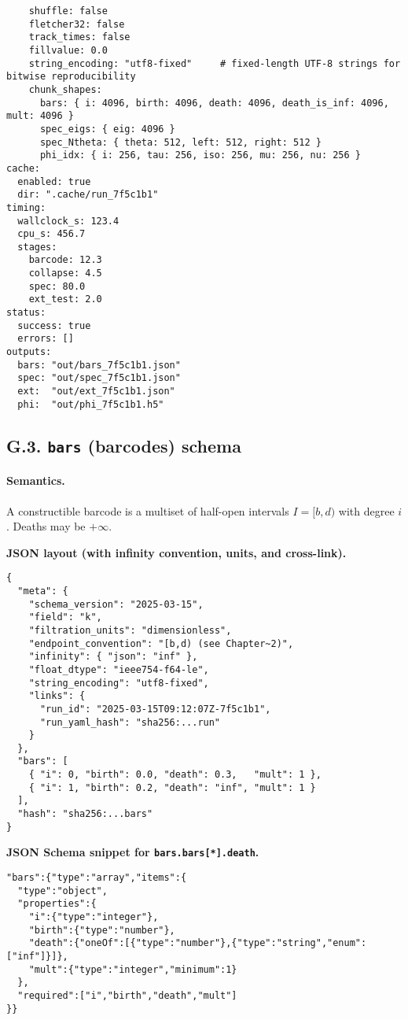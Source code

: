 \documentclass[11pt]{article}
\numberwithin{equation}{section}
\theoremstyle{plain}
\theoremstyle{definition}
\theoremstyle{remark}
\theoremstyle{plain}
\theoremstyle{definition}
\numberwithin{equation}{section}
\theoremstyle{definition}
\numberwithin{equation}{section}
\theoremstyle{plain}
\theoremstyle{definition}
\theoremstyle{remark}
\begin{document}
\begin{verbatim}
    shuffle: false
    fletcher32: false
    track_times: false
    fillvalue: 0.0
    string_encoding: "utf8-fixed"     # fixed-length UTF-8 strings for bitwise reproducibility
    chunk_shapes:
      bars: { i: 4096, birth: 4096, death: 4096, death_is_inf: 4096, mult: 4096 }
      spec_eigs: { eig: 4096 }
      spec_Ntheta: { theta: 512, left: 512, right: 512 }
      phi_idx: { i: 256, tau: 256, iso: 256, mu: 256, nu: 256 }
cache:
  enabled: true
  dir: ".cache/run_7f5c1b1"
timing:
  wallclock_s: 123.4
  cpu_s: 456.7
  stages:
    barcode: 12.3
    collapse: 4.5
    spec: 80.0
    ext_test: 2.0
status:
  success: true
  errors: []
outputs:
  bars: "out/bars_7f5c1b1.json"
  spec: "out/spec_7f5c1b1.json"
  ext:  "out/ext_7f5c1b1.json"
  phi:  "out/phi_7f5c1b1.h5"
\end{verbatim}

\subsection*{G.3. \texttt{bars} (barcodes) schema}
\paragraph{Semantics.} A constructible barcode is a multiset of half-open intervals \(I=[b,d)\) with degree \(i\).
Deaths may be \(+\infty\).

\noindent\textbf{JSON layout (with infinity convention, units, and cross-link).}
\begin{verbatim}
{
  "meta": {
    "schema_version": "2025-03-15",
    "field": "k",
    "filtration_units": "dimensionless",
    "endpoint_convention": "[b,d) (see Chapter~2)",
    "infinity": { "json": "inf" },
    "float_dtype": "ieee754-f64-le",
    "string_encoding": "utf8-fixed",
    "links": {
      "run_id": "2025-03-15T09:12:07Z-7f5c1b1",
      "run_yaml_hash": "sha256:...run"
    }
  },
  "bars": [
    { "i": 0, "birth": 0.0, "death": 0.3,   "mult": 1 },
    { "i": 1, "birth": 0.2, "death": "inf", "mult": 1 }
  ],
  "hash": "sha256:...bars"
}
\end{verbatim}

\noindent\textbf{JSON Schema snippet for \texttt{bars.bars[*].death}.}
\begin{verbatim}
"bars":{"type":"array","items":{
  "type":"object",
  "properties":{
    "i":{"type":"integer"},
    "birth":{"type":"number"},
    "death":{"oneOf":[{"type":"number"},{"type":"string","enum":["inf"]}]},
    "mult":{"type":"integer","minimum":1}
  },
  "required":["i","birth","death","mult"]
}}
\end{verbatim}
\end{document}

